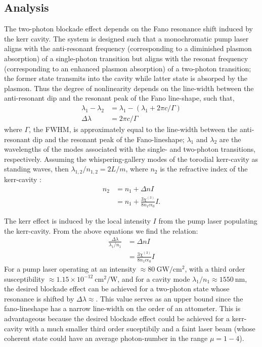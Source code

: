 \documentclass[12pt]{article}
\begin{document}
\subsection{Analysis}
The two-photon blockade effect depends on the Fano resonance shift induced by the kerr 
cavity. The system is designed such that a monochromatic pump laser aligns with the 
anti-resonant frequency (corresponding to a diminished plasmon absorption) of a 
single-photon transition but aligns with the resonat frequency (corresponding to an 
enhanced plasmon absorption) of a two-photon transition; the former state transmits into 
the cavity while latter state is absorped by the plasmon. Thus the degree of nonlinearity 
depends on the line-width between the anti-resonant dip and the resonant peak of the 
Fano line-shape, such that,
\begin{equation}
\begin{split}
\lambda_1 - \lambda_2 &= \lambda_1 - (\lambda_1 + 2\pi c / \Gamma )
\\
\Delta\lambda &= 2\pi c / \Gamma
\end{split}
\end{equation}
where $\Gamma$, the FWHM, is approximately equal to the line-width between the 
anti-resonant dip and the resonant peak of the Fano-lineshape; $\lambda_1$ and 
$\lambda_2$ are the wavelengths of the modes associated with the single- and two-photon
transitions, respectively.  Assuming the whispering-gallery modes of the torodial 
kerr-cavity as standing waves, then $\lambda_{1,2}/n_{1,2} = 2L/m$, where $n_2$
is the refractive index of the kerr-cavity \cite{spillane2002ultralow}:
\begin{equation}
\begin{split}
n_2 &= n_1 + \Delta n I
\\
&= n_1 + \frac{3 \chi^{(3)}}{8 n_1 c\epsilon_0} I.
\end{split}
\end{equation}

The kerr effect is induced by the local intensity $I$ from the pump laser populating
the kerr-cavity. From the above equations we find the relation:
\begin{equation}
\begin{split}
\frac{\Delta \lambda}{\lambda_1 / n_1} &= \Delta n I \\
&= \frac{3 \chi^{(3)}}{8 n_1 c\epsilon_0} I
\end{split}
\end{equation}
For a pump laser operating at an intensity $\approx 80 \:\mathrm{GW/cm^{2}}$, with 
a third order susceptibility $\approx 1.15 \times 10^{-12} \:\mathrm{cm}^2/\mathrm{W}$, 
\cite{qin2010design} and for a cavity mode $\lambda_{1}/{n_1} \approx 1550 \:\mathrm{nm}$, the desired blockade effect can be achieved for a two-photon state whose resonance is 
shifted by $\Delta\lambda \approx $. This value serves as an upper bound since the 
fano-lineshape has a narrow line-width on the order of an attometer. This is advantageous
because the desired blockade effect could be achieved for a kerr-cavity with a much 
smaller third order suceptibily and a faint laser beam (whose coherent state could have 
an average photon-number in the range $\mu = 1-4$).


\newpage


\end{document}
